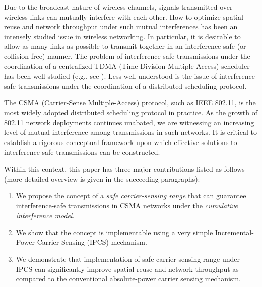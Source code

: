 \documentclass[conference]{IEEEtran}
\begin{document}
Due to the broadcast nature of wireless channels, signals
transmitted over wireless links can mutually interfere with each
other. How to optimize spatial reuse and network throughput under
such mutual interferences has been an intensely studied issue in
wireless networking. In particular, it is desirable to allow as many
links as possible to transmit together in an interference-safe (or
collision-free) manner. The problem of interference-safe
transmissions under the coordination of a centralized TDMA
(Time-Division Multiple-Access) scheduler has been well studied
(e.g., see
\cite{Gurashish,ephremides2,gsharma,oswald,thomasro,Padhye}). Less
well understood is the issue of interference-safe transmissions
under the coordination of a distributed scheduling protocol.

The CSMA (Carrier-Sense Multiple-Access) protocol, such as IEEE
802.11, is the most widely adopted distributed scheduling protocol
in practice. As the growth of 802.11 network deployments continues
unabated, we are witnessing an increasing level of mutual
interference among transmissions in such networks. It is critical to
establish a rigorous conceptual framework upon which effective
solutions to interference-safe transmissions can be constructed.

Within this context, this paper has three major contributions listed
as follows (more detailed overview is given in the succeeding
paragraphs):
\begin{enumerate}
\item{We propose the concept of a \emph{safe carrier-sensing range} that
can guarantee interference-safe transmissions in CSMA networks under
the \emph{cumulative interference model}.}
\item{We show that the concept is implementable using a very simple
Incremental-Power Carrier-Sensing (IPCS) mechanism.}
\item{We demonstrate that implementation of safe carrier-sensing range
under IPCS can signif\/icantly improve spatial reuse and network
throughput as compared to the conventional absolute-power carrier
sensing mechanism.}
\end{enumerate}
\end{document}
